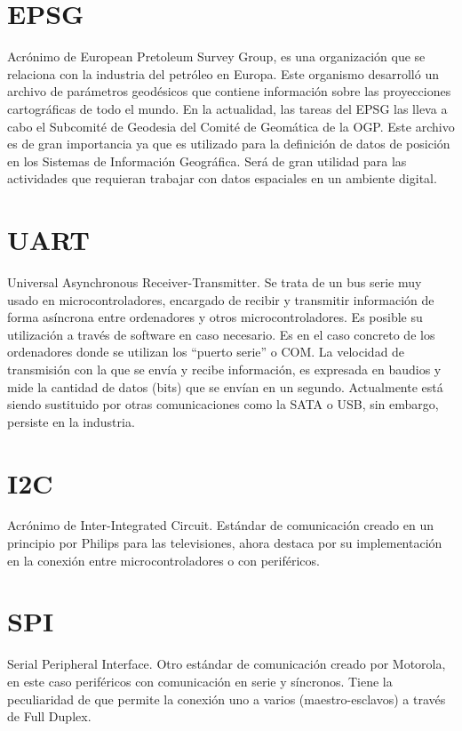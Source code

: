 \section{EPSG}
Acrónimo de European Pretoleum Survey Group,\cite{epsg} es una organización que se relaciona con la industria del petróleo en Europa. Este organismo desarrolló un archivo de parámetros geodésicos que contiene información sobre las proyecciones cartográficas de todo el mundo.
En la actualidad, las tareas del EPSG las lleva a cabo el Subcomité de Geodesia del Comité de Geomática de la OGP.
Este archivo es de gran importancia ya que es utilizado para la definición de datos de posición en los Sistemas de Información Geográfica. Será de gran utilidad para las actividades que requieran trabajar con datos espaciales en un ambiente digital.

\section{UART}
Universal Asynchronous Receiver-Transmitter.\cite{uart} Se trata de un bus serie muy usado en microcontroladores, encargado de recibir y transmitir información de forma asíncrona entre ordenadores y otros microcontroladores. Es posible su utilización a través de software en caso necesario. Es en el caso concreto de los ordenadores donde se utilizan los “puerto serie” o COM. La velocidad de transmisión con la que se envía y recibe información, es expresada en baudios y mide la cantidad de datos (bits) que se envían en un segundo. Actualmente está siendo sustituido por otras comunicaciones como la SATA o USB, sin embargo, persiste en la industria.

\section{I2C}
Acrónimo de Inter-Integrated Circuit.\cite{i2c} Estándar de comunicación creado en un principio por Philips para las televisiones, ahora destaca por su implementación en la conexión entre microcontroladores o con periféricos.

\section{SPI}
Serial Peripheral Interface. \cite{spi} Otro estándar de comunicación creado por Motorola, en este caso periféricos con comunicación en serie y síncronos. Tiene la peculiaridad de que permite la conexión uno a varios (maestro-esclavos) a través de Full Duplex.

